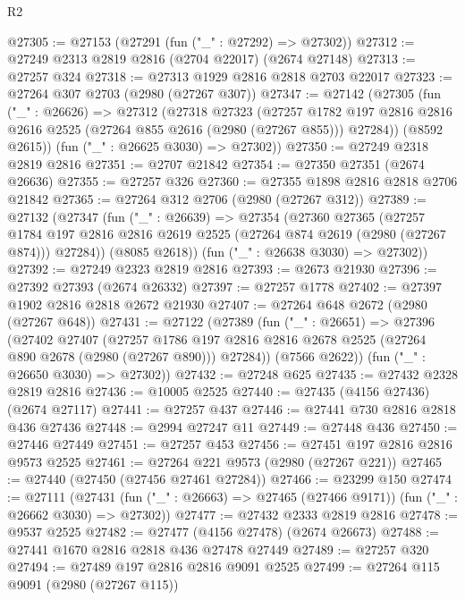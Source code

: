 \begin{lexlean}{R2}
\begin{coremodule}
@27305 := @27153 (@27291 (fun ("_" : @27292) => @27302))
@27312 := @27249 @2313 @2819 @2816 (@2704 @22017) (@2674 @27148)
@27313 := @27257 @324
@27318 := @27313 @1929 @2816 @2818 @2703 @22017
@27323 := @27264 @307 @2703 (@2980 (@27267 @307))
@27347 := @27142
    (@27305
      (fun ("_" : @26626) =>
      @27312
        (@27318
          @27323
          (@27257
            @1782
            @197
            @2816
            @2816
            @2616
            @2525
            (@27264 @855 @2616 (@2980 (@27267 @855)))
            @27284))
        (@8592 @2615))
      (fun ("_" : @26625 @3030) => @27302))
@27350 := @27249 @2318 @2819 @2816
@27351 := @2707 @21842
@27354 := @27350 @27351 (@2674 @26636)
@27355 := @27257 @326
@27360 := @27355 @1898 @2816 @2818 @2706 @21842
@27365 := @27264 @312 @2706 (@2980 (@27267 @312))
@27389 := @27132
    (@27347
      (fun ("_" : @26639) =>
      @27354
        (@27360
          @27365
          (@27257
            @1784
            @197
            @2816
            @2816
            @2619
            @2525
            (@27264 @874 @2619 (@2980 (@27267 @874)))
            @27284))
        (@8085 @2618))
      (fun ("_" : @26638 @3030) => @27302))
@27392 := @27249 @2323 @2819 @2816
@27393 := @2673 @21930
@27396 := @27392 @27393 (@2674 @26332)
@27397 := @27257 @1778
@27402 := @27397 @1902 @2816 @2818 @2672 @21930
@27407 := @27264 @648 @2672 (@2980 (@27267 @648))
@27431 := @27122
    (@27389
      (fun ("_" : @26651) =>
      @27396
        (@27402
          @27407
          (@27257
            @1786
            @197
            @2816
            @2816
            @2678
            @2525
            (@27264 @890 @2678 (@2980 (@27267 @890)))
            @27284))
        (@7566 @2622))
      (fun ("_" : @26650 @3030) => @27302))
@27432 := @27248 @625
@27435 := @27432 @2328 @2819 @2816
@27436 := @10005 @2525
@27440 := @27435 (@4156 @27436) (@2674 @27117)
@27441 := @27257 @437
@27446 := @27441 @730 @2816 @2818 @436 @27436
@27448 := @2994 @27247 @11
@27449 := @27448 @436
@27450 := @27446 @27449
@27451 := @27257 @453
@27456 := @27451 @197 @2816 @2816 @9573 @2525
@27461 := @27264 @221 @9573 (@2980 (@27267 @221))
@27465 := @27440 (@27450 (@27456 @27461 @27284))
@27466 := @23299 @150
@27474 := @27111
    (@27431 (fun ("_" : @26663) => @27465 (@27466 @9171)) (fun ("_" : @26662 @3030) => @27302))
@27477 := @27432 @2333 @2819 @2816
@27478 := @9537 @2525
@27482 := @27477 (@4156 @27478) (@2674 @26673)
@27488 := @27441 @1670 @2816 @2818 @436 @27478 @27449
@27489 := @27257 @320
@27494 := @27489 @197 @2816 @2816 @9091 @2525
@27499 := @27264 @115 @9091 (@2980 (@27267 @115))

\end{coremodule}
\end{lexlean}
